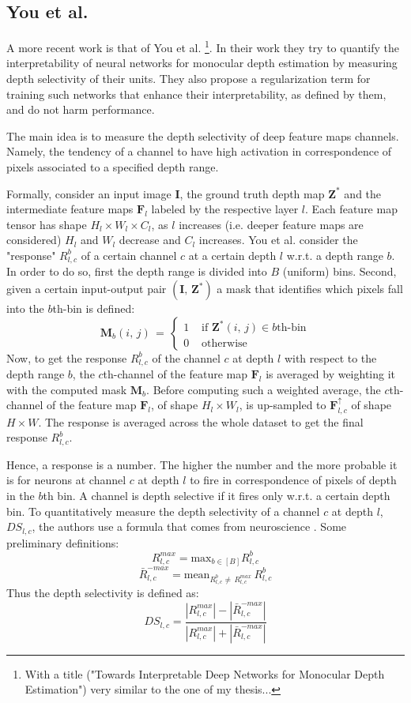 \subsection{You et al.}
A more recent work is that of You et al. \cite{towards_interpretable}\footnote{With a title ("Towards Interpretable Deep Networks for Monocular Depth Estimation") very similar to the one of my thesis...}.
In their work they try to quantify the interpretability of neural networks for monocular depth estimation by measuring depth selectivity of their units.
They also propose a regularization term for training such networks that enhance their interpretability, as defined by them, and do not harm performance.

The main idea is to measure the depth selectivity of deep feature maps channels.
Namely, the tendency of a channel to have high activation in correspondence of pixels associated to a specified depth range.

Formally, consider an input image $\mathbf{I}$, the ground truth depth map $\mathbf{Z}^{*}$ and the intermediate feature maps $\mathbf{F}_{l}$ labeled by the respective layer $l$.
Each feature map tensor has shape $H_{l} \times W_{l} \times C_{l}$, as $l$ increases (i.e. deeper feature maps are considered) $H_{l}$ and $W_{l}$ decrease and $C_{l}$ increases.
You et al. consider the "response" $R_{l, c}^{b}$ of a certain channel $c$ at a certain depth $l$ w.r.t. a depth range $b$.
In order to do so, first the depth range is divided into $B$ (uniform) bins.
Second, given a certain input-output pair $(\mathbf{I}, \, \mathbf{Z}^{*})$ a mask that identifies which pixels fall into the $b$th-bin is defined:
\[
    \mathbf{M}_{b}(i, \, j) \, = \, \begin{cases}
        1 & \text{ if } \mathbf{Z}^{*}(i, \, j) \in b \text{th-bin} \\
        0 & \text{ otherwise}
    \end{cases}
\]
Now, to get the response $R_{l, c}^{b}$ of the channel $c$ at depth $l$ with respect to the depth range $b$, the $c$th-channel of the feature map $\mathbf{F}_{l}$ is averaged by weighting it with the computed mask $\mathbf{M}_{b}$.
Before computing such a weighted average, the $c$th-channel of the feature map $\mathbf{F}_{l}$, of shape $H_{l} \times W_{l}$, is up-sampled to $\mathbf{F}_{l, c}^{\uparrow}$ of shape $H \times W$.
The response is averaged across the whole dataset to get the final response $R_{l, c}^{b}$.

Hence, a response is a number. The higher the number and the more probable it is for neurons at channel $c$ at depth $l$ to fire in correspondence of pixels of depth in the $b$th bin.
A channel is depth selective if it fires only w.r.t. a certain depth bin.
To quantitatively measure the depth selectivity of a channel $c$ at depth $l$, $DS_{l, c}$, the authors use a formula that comes from neuroscience \cite{towards_interpretable}.
Some preliminary definitions:
\[
    R_{l, c}^{max} = \text{max}_{b \in [B]} R_{l, c}^{b}
\]\[
    \bar{R}_{l, c}^{-max} = \text{mean}_{R_{l, c}^{b} \neq \, R_{l, c}^{max}} \, R_{l, c}^{b}
\]
Thus the depth selectivity is defined as:
\[
    DS_{l, c} = \frac
        {|R_{l, c}^{max}| - |\bar{R}_{l, c}^{-max}|}
        {|R_{l, c}^{max}| + |\bar{R}_{l, c}^{-max}|}
\]

